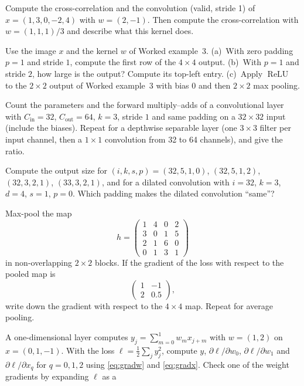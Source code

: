 \documentclass[11pt]{article}
\newcommand{\Cin}{C_{\mathrm{in}}}
\newcommand{\Cout}{C_{\mathrm{out}}}
\newcommand{\ReLU}{\operatorname{ReLU}}
\begin{document}
\begin{questions}
\begin{calculations}
\item Compute the cross-correlation and the convolution (valid, stride 1) of $x = (1, 3, 0, -2, 4)$ with
  $w = (2, -1)$. Then compute the cross-correlation with $w = (1, 1, 1)/3$ and describe what this kernel does.
\item Use the image $x$ and the kernel $w$ of Worked example~3. (a)~With zero padding $p = 1$ and stride $1$, compute the
  first row of the $4 \times 4$ output. (b)~With $p = 1$ and stride $2$, how large is the output? Compute its top-left
  entry. (c)~Apply $\ReLU$ to the $2 \times 2$ output of Worked example~3 with bias $0$ and then $2 \times 2$ max pooling.
\item Count the parameters and the forward multiply--adds of a convolutional layer with $\Cin = 32$, $\Cout = 64$,
  $k = 3$, stride $1$ and same padding on a $32 \times 32$ input (include the biases). Repeat for a depthwise separable layer (one $3 \times 3$
  filter per input channel, then a $1 \times 1$ convolution from 32 to 64 channels), and give the ratio.
\item Compute the output size for $(i, k, s, p) = (32, 5, 1, 0)$, $(32, 5, 1, 2)$, $(32, 3, 2, 1)$, $(33, 3, 2, 1)$,
  and for a dilated convolution with $i = 32$, $k = 3$, $d = 4$, $s = 1$, $p = 0$. Which padding makes the dilated
  convolution ``same''?
\item Max-pool the map
  \[
    h = \begin{pmatrix} 1 & 4 & 0 & 2 \\ 3 & 0 & 1 & 5 \\ 2 & 1 & 6 & 0 \\ 0 & 1 & 3 & 1 \end{pmatrix}
  \]
  in non-overlapping $2 \times 2$ blocks. If the gradient of the loss with respect to the pooled map is
  \[
    \begin{pmatrix} 1 & -1 \\ 2 & 0.5 \end{pmatrix},
  \]
  write down the gradient with respect to the $4 \times 4$ map. Repeat for average pooling.
\item A one-dimensional layer computes $y_j = \sum_{m=0}^{1} w_mx_{j+m}$ with $w = (1, 2)$ on $x = (0, 1, -1)$. With the loss
  $\ell = \frac12\sum_j y_j^2$, compute $y$, $\partial \ell/\partial w_0$, $\partial \ell/\partial w_1$ and $\partial \ell/\partial x_q$
  for $q = 0, 1, 2$ using \eqref{eq:gradw} and \eqref{eq:gradx}. Check one of the weight gradients by expanding $\ell$ as a

\end{calculations}
\end{questions}
\end{document}
